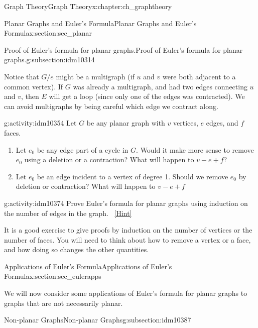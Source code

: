 \documentclass[oneside,10pt,]{book}
\numberwithin{equation}{chapter}
\begin{document}
\begin{chapterptx}{Graph Theory}{}{Graph Theory}{}{}{x:chapter:ch_graphtheory}
\begin{sectionptx}{Planar Graphs and Euler's Formula}{}{Planar Graphs and Euler's Formula}{}{}{x:section:sec_planar}
\begin{subsectionptx}{Proof of Euler's formula for planar graphs.}{}{Proof of Euler's formula for planar graphs.}{}{}{g:subsection:idm10314}
\begin{enumerate}
\end{enumerate}
Notice that \(G/e\) might be a multigraph (if \(u\) and \(v\) were both adjacent to a common vertex).  If \(G\) was already a multigraph, and had two edges connecting \(u\) and \(v\), then \(E\) will get a loop (since only one of the edges was contracted).  We can avoid multigraphs by being careful which edge we contract along.%
\begin{activity}{}{g:activity:idm10354}%
Let \(G\) be any planar graph with \(v\) vertices, \(e\) edges, and \(f\) faces.%
\begin{enumerate}[font=\bfseries,label=(\alph*),ref=\alph*]
\item{}Let \(e_0\) be any edge part of a cycle in \(G\).  Would it make more sense to remove \(e_0\) using a deletion or a contraction?  What will happen to \(v - e + f\)?%
\item{}Let \(e_0\) be an edge incident to a vertex of degree 1.  Should we remove \(e_0\) by deletion or contraction?  What will happen to \(v- e + f\)%
\end{enumerate}
\end{activity}
\begin{activity}{}{g:activity:idm10374}%
Prove Euler's formula for planar graphs using induction on the number of edges in the graph.%
\qquad~\hfill{\tiny\hyperlink{g:hint:idm10377-back}{[Hint]}}\end{activity}
It is a good exercise to give proofs by induction on the number of vertices or the number of faces.  You will need to think about how to remove a vertex or a face, and how doing so changes the other quantities.%
\end{subsectionptx}
\end{sectionptx}
%
%
\typeout{************************************************}
\typeout{************************************************}
%
\begin{sectionptx}{Applications of Euler's Formula}{}{Applications of Euler's Formula}{}{}{x:section:sec_eulerapps}
\begin{introduction}{}%
We will now consider some applications of Euler's formula for planar graphs to graphs that are not necessarily planar.%
\end{introduction}%
%
%
\typeout{************************************************}
\typeout{************************************************}
%
\begin{subsectionptx}{Non-planar Graphs}{}{Non-planar Graphs}{}{}{g:subsection:idm10387}

\end{subsectionptx}
\end{sectionptx}
\end{chapterptx}
\end{document}
